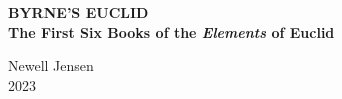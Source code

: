 \documentclass[12pt,cmyk]{report}
\begin{document}
\thispagestyle{empty}
\centering
{\Huge\bfseries BYRNE'S EUCLID}\\
\vspace{4ex}
{\Large\bfseries The First Six Books of the \textit{Elements} of Euclid}\\

\vfill



\vfill

\LARGE{Newell Jensen}\\
\LARGE{2023}
\end{document}

